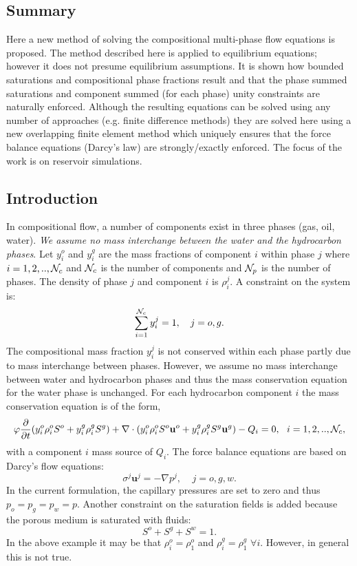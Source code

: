 \subsection{Summary}
Here a new method of solving the compositional multi-phase flow
equations is proposed. The method described here is applied to equilibrium equations; however it does not presume equilibrium assumptions.
It is shown how bounded saturations and compositional phase fractions
result and that the phase summed saturations and
component summed (for each phase) unity constraints are
naturally enforced. Although the resulting equations can
be solved using any number of approaches
(e.g. finite difference methods) they are solved
here using a new overlapping
finite element method which uniquely ensures that the force balance
equations (Darcy's law) are strongly/exactly enforced.
The focus of the work is on reservoir simulations.


\subsection{Introduction}
In compositional flow, a number of components exist in three phases (gas, oil, water).
{\it We assume no mass interchange between the water and the hydrocarbon phases}.
Let $y_i^{o}$ and $y_i^{g}$ are the mass fractions of component $i$
within phase $j$
where $i = 1,2,..,{\cal N}_c$ and ${\cal N}_c$ is the number of components and ${\cal N}_p$ is the
number of phases.
The density of phase $j$ and component $i$ is $\rho_i^j$.
A constraint on the system is:
\begin{equation}
\sum_{i=1}^{{\cal N}_c} y_i^j = 1, ~~~ j = o,g .
\end{equation}
The compositional mass fraction $y_i^j$ is not conserved within each phase partly due to mass interchange between phases.
However, we assume no mass interchange between water and hydrocarbon phases
and thus the mass conservation equation for the water phase is unchanged.
For each hydrocarbon component $i$ the mass conservation
equation is of the form,
\begin{equation}
\phi \frac{\partial}{\partial t}(y_i^o \rho_i^o S^o + y_i^g \rho_i^g S^g) + \nabla \cdot (y_i^o \rho_i^o S^o  \mathbf{u}^{o} + y_i^g \rho_i^g S^g  \mathbf{u}^{g}) - Q_i = 0, ~~i = 1,2,..,{\cal N}_c ,
\label{saturation_2phases}
\end{equation}
with a component $i$ mass source of $Q_i$.
The force balance equations are based on Darcy's flow equations:
\begin{equation}
 \sigma^j {\mathbf u}^j = - \nabla p^j, ~~~~~ j = o,g,w .
\label{force-bal}
\end{equation}
In the current formulation, the capillary pressures are set to zero and thus $ p_o = p_g = p_w  = p $.
Another constraint on the saturation fields is added because the porous medium is saturated with fluids:
\begin{equation}
 S^o + S^g + S^w = 1.
\end{equation}
In the above example it may be that
$\rho_i^o=\rho_1^o$ and $\rho_i^g=\rho_1^g$ $\forall i$.
However, in general this is not true.



